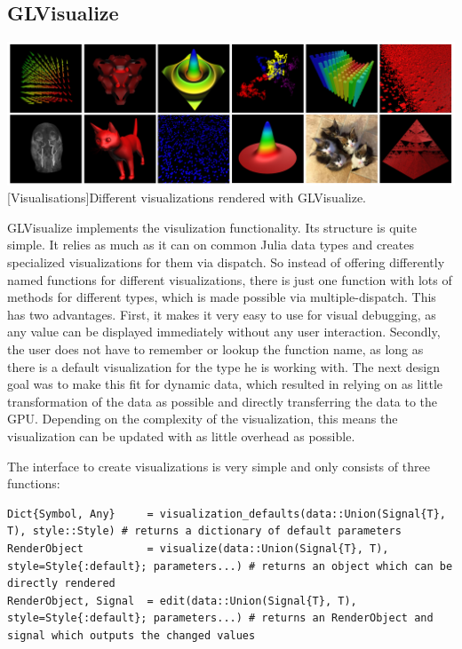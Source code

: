 \subsection{GLVisualize}

\vspace{1em}
\begin{minipage}{\linewidth}
    \centering
    \includegraphics[width=0.9\linewidth]{graphics/glvisualize.jpg}
    [Visualisations]{Different visualizations rendered with GLVisualize.}
    \label{fig:glvisualize}
\end{minipage}

GLVisualize implements the visulization functionality.
Its structure is quite simple. 
It relies as much as it can on common Julia data types and creates specialized visualizations for them via dispatch.
So instead of offering differently named functions for different visualizations, there is just one function with lots of methods for different types, which is made possible via multiple-dispatch.
This has two advantages.
First, it makes it very easy to use for visual debugging, as any value can be displayed immediately without any user interaction.
Secondly, the user does not have to remember or lookup the function name, as long as there is a default visualization for the type he is working with.
The next design goal was to make this fit for dynamic data, which resulted in relying on as little transformation of the data as possible and directly transferring the data to the GPU.
Depending on the complexity of the visualization, this means the visualization can be updated with as little overhead as possible.

The interface to create visualizations is very simple and only consists of three functions:
\begin{lstlisting}
Dict{Symbol, Any}     = visualization_defaults(data::Union(Signal{T}, T), style::Style) # returns a dictionary of default parameters
RenderObject          = visualize(data::Union(Signal{T}, T), style=Style{:default}; parameters...) # returns an object which can be directly rendered
RenderObject, Signal  = edit(data::Union(Signal{T}, T), style=Style{:default}; parameters...) # returns an RenderObject and signal which outputs the changed values
\end{lstlisting}

